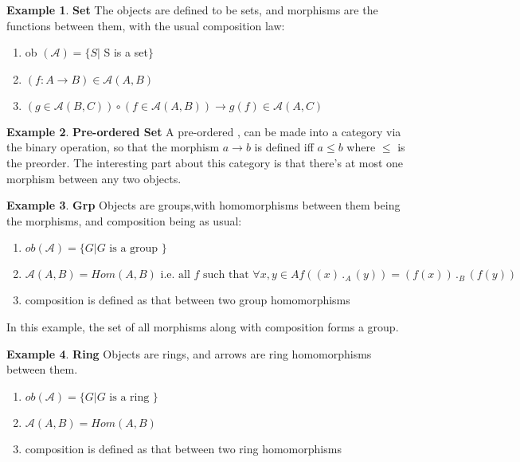 \documentclass{article}
\theoremstyle{definition}
\newtheorem{example}{Example}[section]
\theoremstyle{definition}
\theoremstyle{definition}
\theoremstyle{definition}
\begin{document}
\begin{example}{\textbf{Set}} %
	The objects are defined to be sets, and morphisms are the functions between them, with the usual composition law:
	\begin{enumerate}[label=\roman*] %
		\item ob $ (\mathcal{A}) = \{ S | $  S is a set$ \} $
		\item $  (f:A \rightarrow B )\in \mathcal{A}(A,B)$
		\item  $ (g \in \mathcal{A}(B,C))  \circ (f \in \mathcal{A}(A,B)) \rightarrow  g(f) \in \mathcal{A}(A,C) $
	\end{enumerate}
\end{example}
\begin{example}{\textbf{Pre-ordered Set}} %
	A pre-ordered , can be made into a category via the binary operation, so that the morphism $ a \rightarrow b $ is defined iff $ a\leq b $ where $ \leq  $ is the preorder.
	The interesting part about this category is that there's at most one morphism between any two objects.
\end{example}
\begin{example}{\textbf{Grp}} %
	Objects are groups,with homomorphisms between them being the morphisms, and composition being as usual:
	\begin{enumerate}[label=\roman*]
		\item $  ob(\mathcal{A} ) = \{G| G \text{ is a group } \}  $
		\item $ \mathcal{A} (A,B)= Hom(A,B) \text{ i.e. all } f \text{ such that } \forall x,y \in A f((x) \, ._A \, (y))=(f(x)) \,._B\,(f(y))      $
		\item  composition is defined as that between two group homomorphisms
	\end{enumerate}
	In this example, the set of all morphisms along with composition forms a group.
\end{example}
\begin{example}{\textbf{Ring}} %
	Objects are rings, and arrows are ring homomorphisms between them.
	\begin{enumerate}[label=\roman*]
		\item $  ob(\mathcal{A} ) = \{G| G \text{ is a ring } \}  $
		\item $ \mathcal{A} (A,B) = Hom(A,B) $
		\item  composition is defined as that between two ring homomorphisms
	\end{enumerate}
\end{example}
\end{document}
